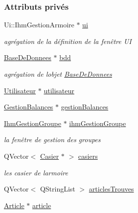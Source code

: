 \subsubsection*{Attributs privés}
\begin{DoxyCompactItemize}
\item 
Ui\+::\+Ihm\+Gestion\+Armoire $\ast$ \hyperlink{class_ihm_gestion_armoire_a793a2816dc21b3161566138d2af5a8b9}{ui}
\begin{DoxyCompactList}\small\item\em agrégation de la définition de la fenêtre UI \end{DoxyCompactList}\item 
\hyperlink{class_base_de_donnees}{Base\+De\+Donnees} $\ast$ \hyperlink{class_ihm_gestion_armoire_ad0d3a89bbcfa9f0e50ff5c50ec64d707}{bdd}
\begin{DoxyCompactList}\small\item\em agrégation de l\textquotesingle{}objet \hyperlink{class_base_de_donnees}{Base\+De\+Donnees} \end{DoxyCompactList}\item 
\hyperlink{class_utilisateur}{Utilisateur} $\ast$ \hyperlink{class_ihm_gestion_armoire_aa14adf3863cf09947411fc33e413076c}{utilisateur}
\item 
\hyperlink{class_gestion_balances}{Gestion\+Balances} $\ast$ \hyperlink{class_ihm_gestion_armoire_a3186adbd003db3309c640ac414d39d2e}{gestion\+Balances}
\item 
\hyperlink{class_ihm_gestion_groupe}{Ihm\+Gestion\+Groupe} $\ast$ \hyperlink{class_ihm_gestion_armoire_af590a9a2a114e7ee791db540f87c01ef}{ihm\+Gestion\+Groupe}
\begin{DoxyCompactList}\small\item\em la fenêtre de gestion des groupes \end{DoxyCompactList}\item 
Q\+Vector$<$ \hyperlink{class_casier}{Casier} $\ast$ $>$ \hyperlink{class_ihm_gestion_armoire_acd01a783a46b27a1b8d1535f5ce16212}{casiers}
\begin{DoxyCompactList}\small\item\em les casier de l\textquotesingle{}armoire \end{DoxyCompactList}\item 
Q\+Vector$<$ Q\+String\+List $>$ \hyperlink{class_ihm_gestion_armoire_a21821dc4f15d87125efb933991eb4385}{articles\+Trouves}
\item 
\hyperlink{class_article}{Article} $\ast$ \hyperlink{class_ihm_gestion_armoire_a0a3af042f7a9d5a6bac634e2b053828d}{article}
\end{DoxyCompactItemize}


